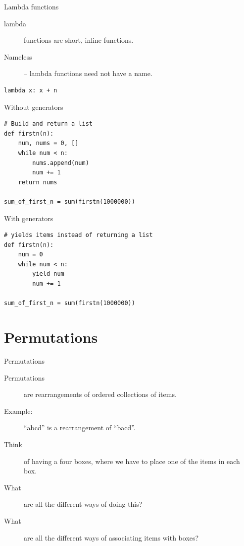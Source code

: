 \begin{frame}[fragile]{Lambda functions}
  \begin{description}
    \item[lambda] functions are short, inline functions.
    \item[Nameless] -- lambda functions need not have a name.
  \end{description}
  \begin{verbatim}
lambda x: x + n
  \end{verbatim}
\end{frame}



\begin{frame}[fragile]{Without generators}
  \begin{verbatim}
# Build and return a list
def firstn(n):
    num, nums = 0, []
    while num < n:
        nums.append(num)
        num += 1
    return nums

sum_of_first_n = sum(firstn(1000000))
  \end{verbatim}
\end{frame}

\begin{frame}[fragile]{With generators}
  \begin{verbatim}
# yields items instead of returning a list
def firstn(n):
    num = 0
    while num < n:
        yield num
        num += 1

sum_of_first_n = sum(firstn(1000000))
  \end{verbatim}
\end{frame}

\section{Permutations}


\begin{frame}{Permutations}
  \begin{description}
    \item[Permutations] are rearrangements of ordered collections of items.
    \item[Example:] ``abcd'' is a rearrangement of ``bacd''.
    \item[Think] of having a four boxes, where we have to place one of the items in each box.
    \item[What] are all the different ways of doing this?
    \item[What] are all the different ways of associating items with boxes?
  \end{description}
\end{frame}

